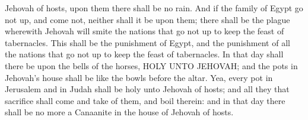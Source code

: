 Jehovah of hosts, upon them there shall be no rain. And if the family of Egypt go not up, and come not, neither shall it be upon them; there shall be the plague wherewith Jehovah will smite the nations that go not up to keep the feast of tabernacles. This shall be the punishment of Egypt, and the punishment of all the nations that go not up to keep the feast of tabernacles. In that day shall there be upon the bells of the horses, HOLY UNTO JEHOVAH; and the pots in Jehovah’s house shall be like the bowls before the altar. Yea, every pot in Jerusalem and in Judah shall be holy unto Jehovah of hosts; and all they that sacrifice shall come and take of them, and boil therein: and in that day there shall be no more a Canaanite in the house of Jehovah of hosts. 